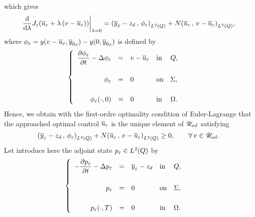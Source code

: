 which gives
\begin{equation*}
    {\left.{%
        \dfrac{\diff}{\diff{\lambda}}J_{\veps}\!\left({%
            \bareps{u} + \lambda\left({v - \bareps{u}}\right)
        }\right)
    }\right|}_{\lambda = 0} = \scalaireq{%
        \bareps{y} - z_{d}
    }{%
        \fieps{}
    } + N\scalaireq{\bareps{u}}{v - \bareps{u}},
\end{equation*}
where ${\phi}_{\varepsilon} = y\!\left({v - {\overline{u}}_{\varepsilon}, {\overline{y}_{0}}_{\varepsilon}}\right) -
y\!\left({0, {\overline{y}_{0}}_{\varepsilon}}\right)$ is defined by
\begin{equation}\label{eq:control125}
    \begin{cases}\displaystyle
        \begin{array}{rclll}
            \dfrac{\partial{}{\phi}_{\varepsilon}}{\partial{}t} - \Delta{\phi}_{\varepsilon} & = & v - {\overline{u}}_{\varepsilon} &
            \text{in} & Q,\\
            \\
            {\phi}_{\varepsilon} & = & 0 & \text{on} & \Sigma,\\
            \\
            {{\phi}_{\varepsilon}}\!\left({\cdot, 0}\right) & = & 0 & \text{in} & \Omega.
        \end{array}
    \end{cases}
\end{equation}
Hence, we obtain with the first-ordre optimality condition of
Euler-Lagrange that the approached optimal control ${\overline{u}}_{\varepsilon}$ is the
unique element of ${\mathscr{U}}_{ad}$ satisfying
\begin{equation}\label{eq:control126}
    \scalaireq{%
        \bareps{y} - z_{d}
    }{%
        \fieps{}
    } + N\scalaireq{%
        \bareps{u}
    }{%
        v - \bareps{u}
    } \geq 0,\qquad\forall\,v\in\uad.
\end{equation}
Let introduce here the adjoint state $p_{\varepsilon}\in L^{2}\!\left({Q}\right)$ by
\begin{equation*}
    \begin{cases}\displaystyle
        \begin{array}{rclll}
            -\dfrac{\partial{}p_{\varepsilon}}{\partial{}t} - \Delta p_{\varepsilon} & = & {\overline{y}}_{\varepsilon} -
            z_{d} & \text{in} & Q,\\
            \\
            p_{\varepsilon} & = & 0 & \text{on} & \Sigma,\\
            \\
            {p_{\varepsilon}}\!\left({\cdot,T}\right) & = & 0 & \text{in} & \Omega.
        \end{array}
    \end{cases}
\end{equation*}
